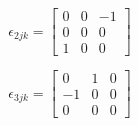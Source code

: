 \begin{equation}
	\epsilon_{2jk}=
	\begin{bmatrix}
		0 & 0 & -1\\
		0 & 0 & 0\\
		1 & 0 & 0
	\end{bmatrix}
\end{equation}

\begin{equation}
	\epsilon_{3jk}=
	\begin{bmatrix}
		0 & 1 & 0\\
		-1 & 0 & 0\\
		0 & 0 & 0
	\end{bmatrix}
\end{equation}




